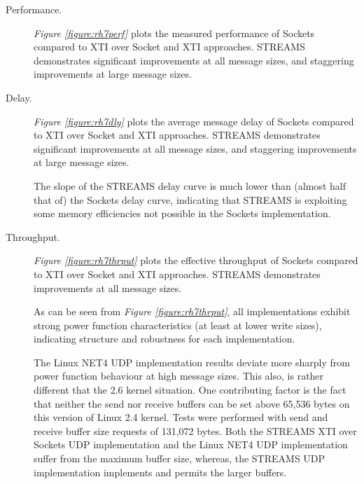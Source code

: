 \documentclass[letterpaper,final,notitlepage,twocolumn,10pt,twoside]{article}
\begin{document}
\begin{description}

\item[Performance.]

\textit{Figure \ref{figure:rh7perf}}
plots the measured performance of Sockets compared to XTI over Socket and XTI approaches.  STREAMS
demonstrates significant improvements at all message sizes, and staggering improvements at large
message sizes.

\item[Delay.]

\textit{Figure \ref{figure:rh7dly}}
plots the average message delay of Sockets compared to XTI over Socket and XTI approaches.  STREAMS
demonstrates significant improvements at all message sizes, and staggering improvements at large
message sizes.

The slope of the STREAMS delay curve is much lower than (almost half that of) the Sockets delay
curve, indicating that STREAMS is exploiting some memory efficiencies not possible in the Sockets
implementation.


\item[Throughput.]

\textit{Figure \ref{figure:rh7thrput}}
plots the effective throughput of Sockets compared to XTI over Socket and XTI approaches.  STREAMS
demonstrates improvements at all message sizes.

As can be seen from \textit{Figure \ref{figure:rh7thrput}}, all implementations exhibit strong power
function characteristics (at least at lower write sizes), indicating structure and robustness for
each implementation.

The Linux NET4 UDP implementation results deviate more sharply from power function behaviour at high
message sizes.  This also, is rather different that the 2.6 kernel situation.  One contributing
factor is the fact that neither the send nor receive buffers can be set above 65,536 bytes on this
version of Linux 2.4 kernel.  Tests were performed with send and receive buffer size requests of
131,072 bytes.  Both the STREAMS XTI over Sockets UDP implementation and the Linux NET4 UDP
implementation suffer from the maximum buffer size, whereas, the STREAMS UDP implementation
implements and permits the larger buffers.


\end{description}
\end{document}
